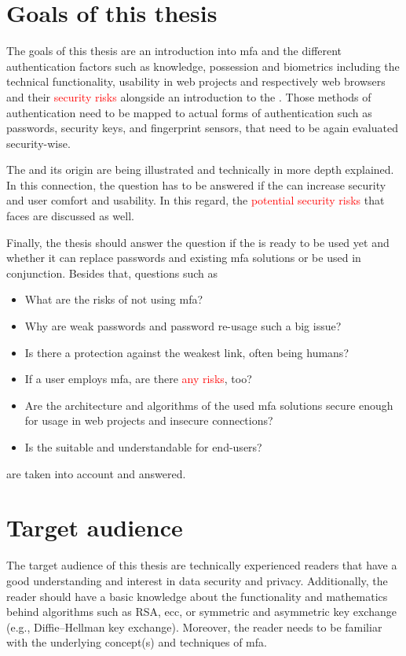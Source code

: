 \section{Goals of this thesis}

The goals of this thesis are an introduction into \gls{mfa} and the different authentication factors such as \frqq knowledge, possession and biometrics\flqq{} including the technical functionality, usability in web projects and respectively web browsers and their \textcolor{red}{security risks} alongside an introduction to the \wa. Those methods of authentication need to be mapped to actual forms of authentication such as passwords, security keys, and fingerprint sensors, that need to be again evaluated security-wise.

The \wa{} and its origin are being illustrated and technically in more depth explained. In this connection, the question has to be answered if the \wa{} can increase security and user comfort and usability. In this regard, the \textcolor{red}{potential security risks} that \wa{} faces are discussed as well.

Finally, the thesis should answer the question if the \wa{} is ready to be used yet and whether it can replace passwords and existing \gls{mfa} solutions or be used in conjunction.
Besides that, questions such as

\begin{itemize}
	\item What are the risks of not using \gls{mfa}?
	\item Why are weak passwords and password re-usage such a big issue?
	\item Is there a protection against the weakest link, often being humans?
	\item If a user employs \gls{mfa}, are there \textcolor{red}{any risks}, too?
	\item Are the architecture and algorithms of the used \gls{mfa} solutions secure enough for usage in web projects and insecure connections?
	\item Is the \wa{} suitable and understandable for end-users?
\end{itemize}

are taken into account and answered.

\section{Target audience}

The target audience of this thesis are technically experienced readers that have a good understanding and interest in data security and privacy. Additionally, the reader should have a basic knowledge about the functionality and mathematics behind algorithms such as RSA, \gls{ecc}, or symmetric and asymmetric key exchange (e.g., Diffie–Hellman key exchange). Moreover, the reader needs to be familiar with the underlying concept(s) and techniques of \gls{mfa}.

